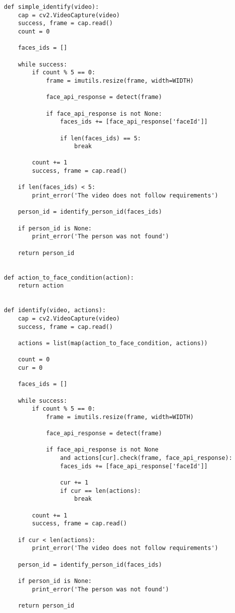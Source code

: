 \begin{verbatim}
def simple_identify(video):
    cap = cv2.VideoCapture(video)
    success, frame = cap.read()
    count = 0

    faces_ids = []

    while success:
        if count % 5 == 0:
            frame = imutils.resize(frame, width=WIDTH)

            face_api_response = detect(frame)

            if face_api_response is not None:
                faces_ids += [face_api_response['faceId']]

                if len(faces_ids) == 5:
                    break

        count += 1
        success, frame = cap.read()

    if len(faces_ids) < 5:
        print_error('The video does not follow requirements')

    person_id = identify_person_id(faces_ids)

    if person_id is None:
        print_error('The person was not found')

    return person_id


def action_to_face_condition(action):
    return action


def identify(video, actions):
    cap = cv2.VideoCapture(video)
    success, frame = cap.read()

    actions = list(map(action_to_face_condition, actions))

    count = 0
    cur = 0

    faces_ids = []

    while success:
        if count % 5 == 0:
            frame = imutils.resize(frame, width=WIDTH)

            face_api_response = detect(frame)

            if face_api_response is not None 
                and actions[cur].check(frame, face_api_response):
                faces_ids += [face_api_response['faceId']]

                cur += 1
                if cur == len(actions):
                    break

        count += 1
        success, frame = cap.read()

    if cur < len(actions):
        print_error('The video does not follow requirements')

    person_id = identify_person_id(faces_ids)

    if person_id is None:
        print_error('The person was not found')

    return person_id
\end{verbatim}

